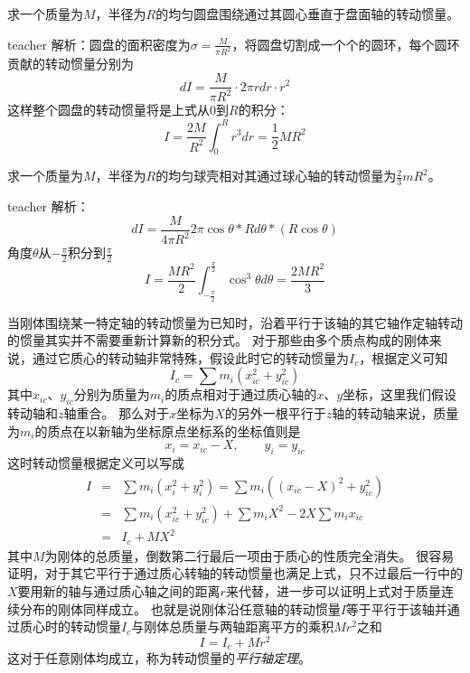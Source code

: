\begin{example}
求一个质量为$M$，半径为$R$的均匀圆盘围绕通过其圆心垂直于盘面轴的转动惯量。
\begin{taggedblock}{teacher}
\newline
解析：圆盘的面积密度为$\sigma = \frac{M}{\pi R^2}$，将圆盘切割成一个个的圆环，每个圆环贡献的转动惯量分别为
\[dI = \frac{M}{\pi R^2}\cdot 2\pi r dr\cdot r^2\]
这样整个圆盘的转动惯量将是上式从0到$R$的积分：
\[
I = \frac{2M}{R^2}\int_0^Rr^3dr = \frac{1}{2}MR^2
\]
\end{taggedblock}
\end{example}


\begin{example}
求一个质量为$M$，半径为$R$的均匀球壳相对其通过球心轴的转动惯量为$\frac{2}{3}mR^2$。
\begin{taggedblock}{teacher}
\newline
解析：\[dI = \frac{M}{4\pi R^2}2\pi\cos\theta*Rd\theta*(R\cos\theta)\]
角度$\theta$从$-\frac{\pi}{2}$积分到$\frac{\pi}{2}$
\[I = \frac{MR^2}{2}\int_{-\frac{\pi}{2}}^{\frac{\pi}{2}}\cos^3\theta d\theta=\frac{2MR^2}{3}\]
\end{taggedblock}
\end{example}

当刚体围绕某一特定轴的转动惯量为已知时，沿着平行于该轴的其它轴作定轴转动的惯量其实并不需要重新计算新的积分式。
对于那些由多个质点构成的刚体来说，通过它质心的转动轴非常特殊，假设此时它的转动惯量为$I_{c}$，根据定义可知
\begin{equation}
I_{c} = \sum m_i(x_{ic}^2+y_{ic}^2)
\end{equation}
其中$x_{ic}$、$y_{ic}$分别为质量为$m_i$的质点相对于通过质心轴的$x$、$y$坐标，这里我们假设转动轴和$z$轴重合。
那么对于$x$坐标为$X$的另外一根平行于$z$轴的转动轴来说，质量为$m_i$的质点在以新轴为坐标原点坐标系的坐标值则是
\[x_i = x_{ic}-X,\qquad y_i = y_{ic}\]
这时转动惯量根据定义可以写成
\begin{eqnarray}
I &=& \sum m_i(x_i^2+y_i^2) = \sum m_i((x_{ic}-X)^2+y_{ic}^2)\nonumber\\
&=& \sum m_i (x_{ic}^2+y_{ic}^2)+\sum m_i X^2 -2X\sum m_i x_{ic}\nonumber\\
&=&I_c +MX^2 
\end{eqnarray}
其中$M$为刚体的总质量，倒数第二行最后一项由于质心的性质完全消失。
很容易证明，对于其它平行于通过质心转轴的转动惯量也满足上式，只不过最后一行中的$X$要用新的轴与通过质心轴之间的距离$r$来代替，进一步可以证明上式对于质量连续分布的刚体同样成立。
也就是说刚体沿任意轴的转动惯量$I$等于平行于该轴并通过质心时的转动惯量$I_c$与刚体总质量与两轴距离平方的乘积$Mr^2$之和
\begin{equation}
I = I_c + Mr^2
\end{equation}
这对于任意刚体均成立，称为转动惯量的\emph{平行轴定理}。

